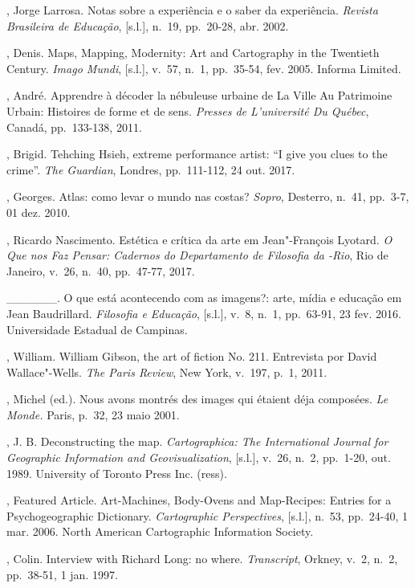 \begin{Parskip}
, Jorge Larrosa. Notas sobre a experiência e o saber da
experiência. \emph{Revista Brasileira de Educação}, {[}s.l.{]}, n.~19,
pp.~20-28, abr. 2002.

, Denis. Maps, Mapping, Modernity: Art and Cartography in the
Twentieth Century. \emph{Imago Mundi}, {[}s.l.{]}, v.~57, n.~1,
pp.~35-54, fev. 2005. Informa  Limited.

, André. Apprendre à décoder la nébuleuse urbaine de La
Ville Au Patrimoine Urbain: Histoires de forme et de sens. \emph{Presses de
L'université Du Québec}, Canadá, pp.~133-138, 2011.

, Brigid. Tehching Hsieh, extreme performance artist: ``I give
you clues to the crime''. \emph{The Guardian}, Londres, pp.~111-112, 24
out. 2017.

, Georges. Atlas: como levar o mundo nas costas?
\emph{Sopro}, Desterro, n.~41, pp.~3-7, 01 dez. 2010. 

, Ricardo Nascimento. Estética e crítica da arte em
Jean"-François Lyotard. \emph{O Que nos Faz Pensar: Cadernos do
Departamento de Filosofia da -Rio}, Rio de Janeiro, v.~26, n.~40,
pp.~47-77, 2017.

\_\_\_\_\_\_. O que está acontecendo com as imagens?: arte, mídia e
educação em Jean Baudrillard. \emph{Filosofia e Educação}, {[}s.l.{]},
v.~8, n.~1, pp.~63-91, 23 fev. 2016. Universidade Estadual de Campinas.

, William. William Gibson, the art of fiction No. 211. Entrevista por David
Wallace"-Wells. \emph{The
Paris Review}, New York, v.~197, p.~1, 2011. 

, Michel (ed.). Nous avons montrés des images qui étaient déja
composées. \emph{Le Monde.} Paris, p.~32, 23 maio 2001.

, J. B. Deconstructing the map. \emph{Cartographica: The
International Journal for Geographic Information and Geovisualization},
{[}s.l.{]}, v.~26, n.~2, pp.~1-20, out. 1989. University of Toronto Press
Inc. (ress).

, Featured Article. Art-Machines, Body-Ovens and Map-Recipes:
Entries for a Psychogeographic Dictionary. \emph{Cartographic
Perspectives}, {[}s.l.{]}, n.~53, pp.~24-40, 1 mar. 2006. North American
Cartographic Information Society.

, Colin. Interview with Richard Long: no where.
\emph{Transcript}, Orkney, v.~2, n.~2, pp.~38-51, 1 jan. 1997.


\end{Parskip}
